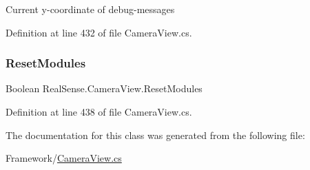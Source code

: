 Current y-\/coordinate of debug-\/messages 

Definition at line 432 of file Camera\+View.\+cs.

\mbox{\label{class_real_sense_1_1_camera_view_a342611e6157bb18b9c097186b3b9bee0}} 
\subsubsection{\texorpdfstring{Reset\+Modules}{ResetModules}}
{\footnotesize\ttfamily Boolean Real\+Sense.\+Camera\+View.\+Reset\+Modules\hspace{0.3cm}{\ttfamily [set]}}



Definition at line 438 of file Camera\+View.\+cs.



The documentation for this class was generated from the following file\+:\begin{DoxyCompactItemize}
\item 
Framework/\hyperlink{_camera_view_8cs}{Camera\+View.\+cs}\end{DoxyCompactItemize}
